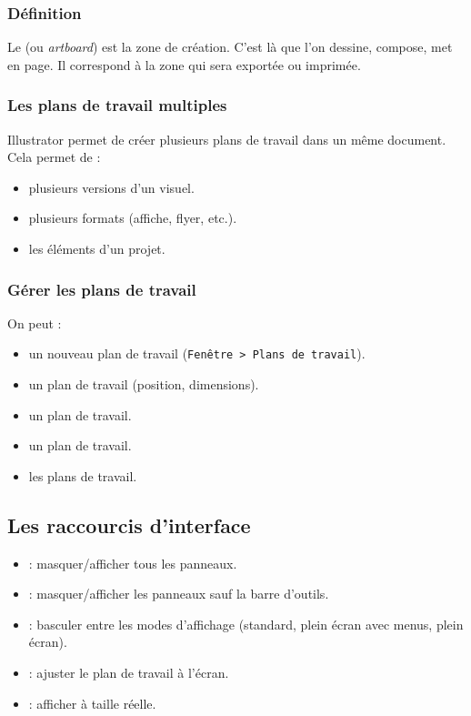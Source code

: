 \subsubsection{Définition}

Le  (ou \emph{artboard}) est la zone de création. C'est là que l'on dessine, compose, met en page. Il correspond à la zone qui sera exportée ou imprimée.

\subsubsection{Les plans de travail multiples}

Illustrator permet de créer plusieurs plans de travail dans un même document. Cela permet de :

\begin{itemize}
    \item {} plusieurs versions d'un visuel.
    \item {} plusieurs formats (affiche, flyer, etc.).
    \item {} les éléments d'un projet.
\end{itemize}

\subsubsection{Gérer les plans de travail}

On peut :

\begin{itemize}
    \item {} un nouveau plan de travail (\texttt{Fenêtre > Plans de travail}).
    \item {} un plan de travail (position, dimensions).
    \item {} un plan de travail.
    \item {} un plan de travail.
    \item {} les plans de travail.
\end{itemize}

\subsection{Les raccourcis d'interface}

\begin{itemize}
    \item {} : masquer/afficher tous les panneaux.
    \item {} : masquer/afficher les panneaux sauf la barre d'outils.
    \item {} : basculer entre les modes d'affichage (standard, plein écran avec menus, plein écran).
    \item {} : ajuster le plan de travail à l'écran.
    \item {} : afficher à taille réelle.
\end{itemize}

